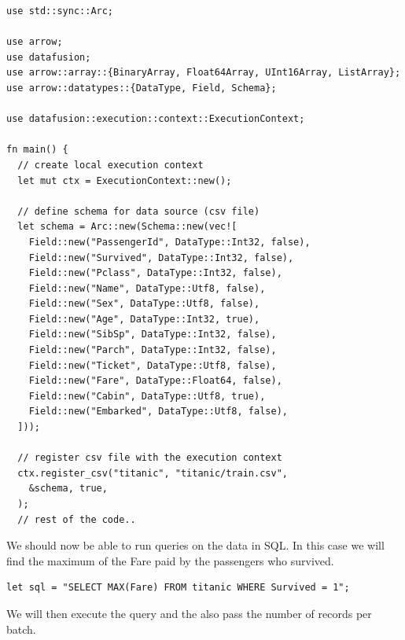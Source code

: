 \documentclass{book}
\begin{document}
\begin{lstlisting}[caption={chapter4\\/working\_with\_data\\/data\_transformations\_datafusion\\/src\\/main\\.rs},basicstyle=\small]
use std::sync::Arc;

use arrow;
use datafusion;
use arrow::array::{BinaryArray, Float64Array, UInt16Array, ListArray};
use arrow::datatypes::{DataType, Field, Schema};

use datafusion::execution::context::ExecutionContext;

fn main() {
  // create local execution context
  let mut ctx = ExecutionContext::new();

  // define schema for data source (csv file)
  let schema = Arc::new(Schema::new(vec![
    Field::new("PassengerId", DataType::Int32, false),
    Field::new("Survived", DataType::Int32, false),
    Field::new("Pclass", DataType::Int32, false),
    Field::new("Name", DataType::Utf8, false),
    Field::new("Sex", DataType::Utf8, false),
    Field::new("Age", DataType::Int32, true),
    Field::new("SibSp", DataType::Int32, false),
    Field::new("Parch", DataType::Int32, false),
    Field::new("Ticket", DataType::Utf8, false),
    Field::new("Fare", DataType::Float64, false),
    Field::new("Cabin", DataType::Utf8, true),
    Field::new("Embarked", DataType::Utf8, false),
  ]));

  // register csv file with the execution context
  ctx.register_csv("titanic", "titanic/train.csv",
    &schema, true,
  );
  // rest of the code..
\end{lstlisting}

We should now be able to run queries on the data in SQL. In this case we will find the maximum of the Fare paid by the passengers who survived.

\begin{lstlisting}[caption={chapter4\\/working\_with\_data\\/data\_transformations\_datafusion\\/src\\/main\\.rs},basicstyle=\small]
let sql = "SELECT MAX(Fare) FROM titanic WHERE Survived = 1";
\end{lstlisting}

We will then execute the query and the also pass the number of records per batch.
\end{document}
